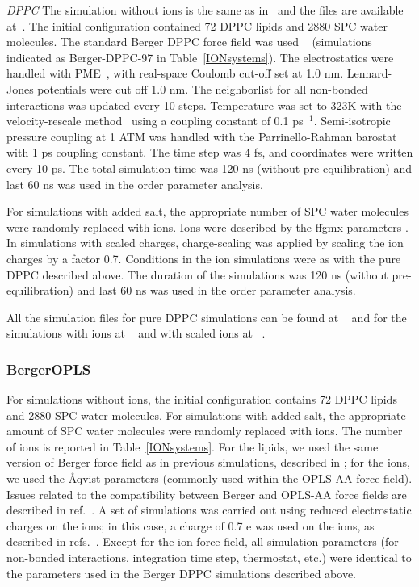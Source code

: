 \documentclass[pre,aps,floatfix,authordate1-4,twocolumn]{revtex4-1}
\begin{document}
{\it DPPC} The simulation without ions is the same as in~\cite{botan15} and the files are available at~\cite{bergerDPPCfiles}.
The initial configuration contained 72 DPPC lipids and 2880 SPC water molecules.
The standard Berger DPPC force field was used ~\cite{berger97} (simulations indicated as Berger-DPPC-97 in Table~\ref{IONsystems}). 
The electrostatics were handled with PME~\cite{darden93,essman95}, with real-space Coulomb cut-off set at 1.0 nm. Lennard-Jones potentials were cut off 1.0 nm. The neighborlist for all non-bonded interactions was updated every 10 steps. 
Temperature was set to 323K with the velocity-rescale method~\cite{bussi07} using a coupling constant of 0.1 ps$^{-1}$.  Semi-isotropic pressure coupling at 1 ATM was handled with the Parrinello-Rahman barostat~\cite{parrinello81} with 1 ps coupling constant. The time step was 4 fs, and coordinates were written every 10 ps. The total simulation time was 120 ns (without pre-equilibration) and last 60 ns was used in the order parameter analysis. 

For simulations with added salt, the appropriate number of SPC water molecules were randomly replaced with ions. Ions were described by the ffgmx parameters \cite{straatsma88}. In simulations with scaled charges, charge-scaling was applied by scaling the ion charges  by a factor 0.7. Conditions in the ion simulations were as with the pure DPPC described above. The duration of the simulations was 120 ns (without pre-equilibration) and last 60 ns was used in the order parameter analysis.

All the simulation files for pure DPPC simulations can be found at ~\cite{bergerDPPCfiles} and for the simulations with ions at 
~\cite{bergerDPPC150mMfiles, bergerDPPC1000mMfiles} 
and with scaled ions at ~\cite{DPPCBergerNaCl150mMscaled, DPPCBergerNaCl1000mMscaled}.



\subsubsection{BergerOPLS}
For simulations without ions, the initial configuration contains 72 DPPC lipids and 2880 SPC water molecules. For simulations with added salt, the appropriate amount of SPC water molecules were randomly replaced with ions. The number of ions is reported in Table~\ref{IONsystems}.
For the lipids, we used the same version of Berger force field as in previous simulations, described in \cite{berger97}; for the ions, we used the Åqvist parameters \cite{aqvist90} (commonly used within the OPLS-AA force field). Issues related to the compatibility between Berger and OPLS-AA force fields are described in ref.~\cite{tieleman06}. 
A set of simulations was carried out using reduced electrostatic charges on the ions; in this case, a charge of 0.7 e was used on the ions, as described in refs.~\cite{kohagen15, leontyev11}. Except for the ion force field, all simulation parameters (for non-bonded interactions, integration time step, thermostat, etc.) were identical to the parameters used in the Berger DPPC simulations described above.
\end{document}
